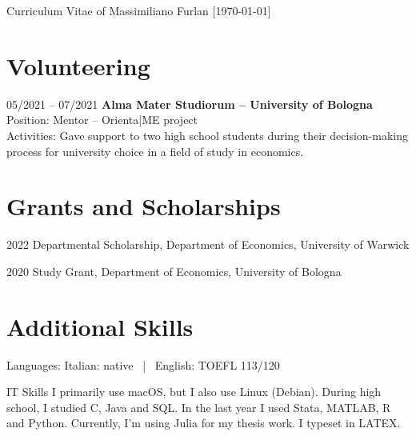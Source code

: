 \documentclass[11pt,a4paper]{article}
\begin{document}
\begin{cv}{\huge Curriculum Vitae of Massimiliano Furlan \large{[\today ]}}
\section{Volunteering}
\begin{cvlist}{}
	\item[05/2021 -- 07/2021]
		\textbf{Alma Mater Studiorum – University of Bologna}\\
		Position: Mentor -- Orienta|ME project\\
		Activities: Gave support to two high school students during their decision-making process for university choice in a field of study in economics.
\end{cvlist}
\vspace{-20pt}

\section{Grants and Scholarships}
\begin{cvlist}{}
	\itemsep -4pt
	\item[2022] Departmental Scholarship, Department of Economics, University of Warwick 
	\item[2020] Study Grant, Department of Economics, University of Bologna
\end{cvlist}


\section{Additional Skills}
\begin{cvlist}{}
	\item[Languages:] 
		Italian: native \ | \
		English: TOEFL 113/120
	\item[IT Skills] 
		I primarily use macOS, but I also use Linux (Debian). During high school, I studied C, Java and SQL. In the last year I used Stata, MATLAB, R and Python. Currently, I’m using Julia for my thesis work. I typeset in LATEX.
\end{cvlist}


\end{cv}
\end{document}
